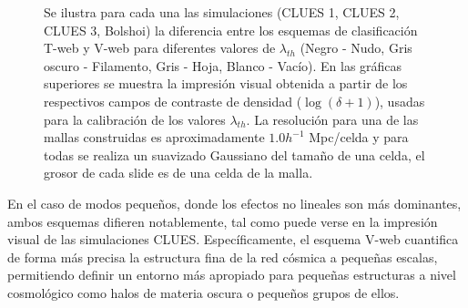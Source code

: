 \begin{figure}[htbp]
	\begin{center}
	\end{center}

	\caption{\small{Se ilustra para cada una las simulaciones
	(CLUES 1, CLUES 2, CLUES 3, Bolshoi) la diferencia entre los 
	esquemas de clasificación T-web y V-web para diferentes valores de 
	$\lambda_{th}$ (Negro - Nudo, Gris oscuro - Filamento, Gris - Hoja, 
	Blanco - Vacío). En las gráficas superiores se muestra la impresión 
	visual obtenida a partir de los respectivos campos de contraste de 
	densidad ($\log (\delta+1)$), usadas para la calibración de los valores 
	$\lambda_{th}$. La resolución para una de las mallas construidas es 
	aproximadamente $1.0 h^{-1}$ Mpc/celda y para todas se realiza un
	suavizado Gaussiano del tamaño de una celda, el grosor de cada slide
	es de una celda de la malla.}}
	
	\label{fig:TwebVwebComparison}
\end{figure}


En el caso de modos pequeños, donde los efectos no lineales son más 
do\-minantes, ambos esquemas difieren notablemente, tal como puede verse en 
la impresión visual de las simulaciones CLUES. Específicamente, el esquema 
V-web cuantifica de forma más precisa la estructura fina de la red 
cósmica a pequeñas escalas, permitiendo definir un entorno más apropiado 
para pequeñas estructuras a nivel cosmológico como halos de materia oscura 
o pequeños grupos de ellos.


